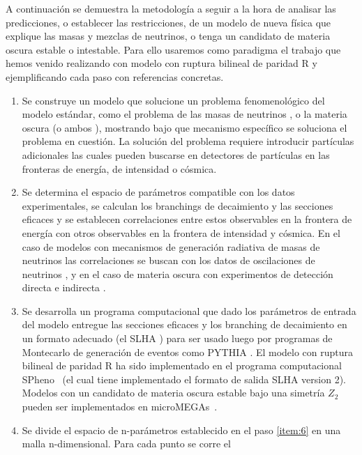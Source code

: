 A continuación se demuestra la metodología a seguir a la hora de
analisar las predicciones, o establecer las restricciones, de un
modelo de nueva física que explique las masas y mezclas de neutrinos,
o tenga un candidato de materia oscura estable o intestable. Para
ello usaremos como paradigma el trabajo que hemos venido realizando
con modelo con ruptura bilineal de paridad R y ejemplificando cada
paso con referencias concretas.
\begin{enumerate}
\item Se construye un modelo que solucione un problema fenomenológico
  del modelo estándar, como el problema de las masas de neutrinos
  \cite{Hirsch:2000ef}, o la materia oscura (o ambos
  \cite{Hirsch:2005ag,Restrepo:2011rj}), mostrando bajo que mecanismo
  específico se soluciona el problema en cuestión. La solución del
  problema requiere introducir partículas adicionales las cuales
  pueden buscarse en detectores de partículas en las fronteras de
  energía, de intensidad o cósmica.
  \label{item:5}
\item Se determina el espacio de parámetros compatible con los datos
  experimentales, se calculan los branchings de decaimiento y las
  secciones eficaces y se establecen correlaciones entre estos
  observables en la frontera de energía con otros observables en la
  frontera de intensidad y cósmica. En el caso de modelos con
  mecanismos de generación radiativa de masas de neutrinos las
  correlaciones se buscan con los datos de oscilaciones de neutrinos
  \cite{Diaz:2003as}, y en el caso de materia oscura con experimentos
  de detección directa e indirecta \cite{Choi:2010xn,Restrepo:2011rj}.
  \label{item:6}
\item Se desarrolla un programa computacional que dado los parámetros
  de entrada del modelo entregue las secciones eficaces y los
  branching de decaimiento en un formato adecuado (el SLHA
  \cite{Allanach:2008qq}) para ser usado luego por programas de Montecarlo
  de generación de eventos como PYTHIA \cite{Sjostrand:2006za}. El
  modelo con ruptura bilineal de paridad R ha sido implementado en el
  programa computacional SPheno~\cite{Porod:2003um} (el cual tiene
  implementado el formato de salida SLHA version 2). Modelos con un
  candidato de materia oscura estable bajo una simetría $Z_2$ pueden
  ser implementados en microMEGAs~\cite{Belanger:2006is}.
  \label{item:7}
\item Se divide el espacio de n-parámetros establecido en el paso
  \ref{item:6} en una malla n-dimensional. Para cada punto se corre el

\end{enumerate}
